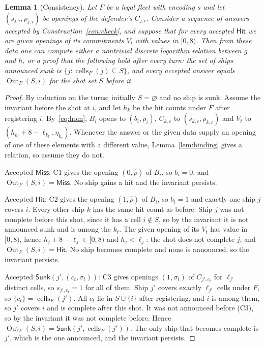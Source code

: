 \documentclass[11pt]{article}
\newtheorem{lemma}{Lemma}[section]
\theoremstyle{definition}
\theoremstyle{remark}
\newcommand{\Out}{\operatorname{Out}}
\newcommand{\cells}{\operatorname{cells}}
\begin{document}
\begin{lemma}[Consistency]\label{lem:consistency}
Let $F$ be a legal fleet with encoding $s$ and let $(s_{j,i},\rho_{j,i})$ be openings of the defender's $C_{j,i}$. Consider a sequence of answers accepted by Construction~\ref{con:check}, and suppose that for every accepted $\mathsf{Hit}$ we are given openings of its commitments $V_t$ with values in $[0,8)$. Then from these data one can compute either a nontrivial discrete logarithm relation between $g$ and $h$, or a proof that the following hold after every turn: the set of ships announced sunk is $\{j:\cells_F(j)\subseteq S\}$, and every accepted answer equals $\Out_F(S,i)$ for the shot set $S$ before it.
\end{lemma}
\begin{proof}
By induction on the turns; initially $S=\varnothing$ and no ship is sunk. Assume the invariant before the shot at $i$, and let $h_k$ be the hit counts under $F$ after registering $i$. By~\eqref{eq:hom}, $B_i$ opens to $(b_i,\bar\rho_i)$, $C_{k,c}$ to $(s_{k,c},\rho_{k,c})$ and $V_t$ to $(h_{k_t}+8-\ell_{k_t},\eta_{k_t})$. Whenever the answer or the given data supply an opening of one of these elements with a different value, Lemma~\ref{lem:binding} gives a relation, so assume they do not.

Accepted $\mathsf{Miss}$: C1 gives the opening $(0,\hat\rho)$ of $B_i$, so $b_i=0$, and $\Out_F(S,i)=\mathsf{Miss}$. No ship gains a hit and the invariant persists.

Accepted $\mathsf{Hit}$: C2 gives the opening $(1,\hat\rho)$ of $B_i$, so $b_i=1$ and exactly one ship $j$ covers $i$. Every other ship $k$ has the same hit count as before. Ship $j$ was not complete before this shot, since it has a cell $i\notin S$, so by the invariant it is not announced sunk and is among the $k_t$. The given opening of its $V_t$ has value in $[0,8)$, hence $h_j+8-\ell_j\in[0,8)$ and $h_j<\ell_j$: the shot does not complete $j$, and $\Out_F(S,i)=\mathsf{Hit}$. No ship becomes complete and none is announced, so the invariant persists.

Accepted $\mathsf{Sunk}(j',(c_t,\sigma_t))$: C3 gives openings $(1,\sigma_t)$ of $C_{j',c_t}$ for $\ell_{j'}$ distinct cells, so $s_{j',c_t}=1$ for all of them. Ship $j'$ covers exactly $\ell_{j'}$ cells under $F$, so $\{c_t\}=\cells_F(j')$. All $c_t$ lie in $S\cup\{i\}$ after registering, and $i$ is among them, so $j'$ covers $i$ and is complete after this shot. It was not announced before (C3), so by the invariant it was not complete before. Hence $\Out_F(S,i)=\mathsf{Sunk}(j',\cells_F(j'))$. The only ship that becomes complete is $j'$, which is the one announced, and the invariant persists.
\end{proof}
\end{document}
